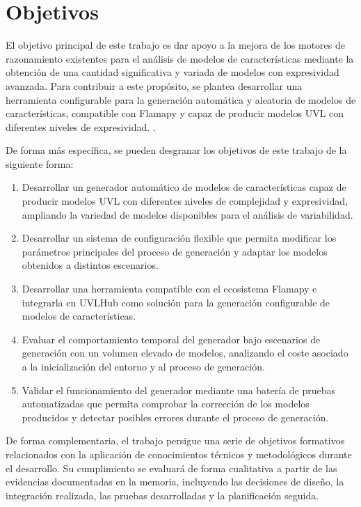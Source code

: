\section{Objetivos}
\label{sec:objetivos}



El objetivo principal de este trabajo es dar apoyo a la mejora de los motores de razonamiento existentes para el análisis de modelos de características mediante la obtención de una cantidad significativa y variada de modelos con expresividad avanzada. Para contribuir a este propósito, se plantea desarrollar una herramienta
configurable para la generación automática y aleatoria de modelos de
características, compatible con Flamapy y capaz de producir modelos UVL con
diferentes niveles de expresividad. \cite{sundermann2024generating}.

De forma más específica, se pueden desgranar los objetivos de este trabajo de la siguiente forma:

\begin{enumerate}[label=\textbf{O\arabic*.}]
      \item Desarrollar un generador automático de modelos de características capaz de producir modelos UVL con diferentes niveles de complejidad y expresividad, ampliando la variedad de modelos disponibles para el análisis de variabilidad.

      \item Desarrollar un sistema de configuración flexible que permita modificar los parámetros principales del proceso de generación y adaptar los modelos obtenidos a distintos escenarios.

      \item Desarrollar una herramienta compatible con el ecosistema Flamapy e integrarla en UVLHub como solución para la generación configurable de modelos de características.

      \item Evaluar el comportamiento temporal del generador bajo escenarios de generación con un volumen elevado de modelos, analizando el coste asociado a la inicialización del entorno y al proceso de generación.

      \item Validar el funcionamiento del generador mediante una batería de pruebas automatizadas que permita comprobar la corrección de los modelos producidos y detectar posibles errores durante el proceso de generación.
\end{enumerate}

De forma complementaria, el trabajo persigue una serie de objetivos formativos
relacionados con la aplicación de conocimientos técnicos y metodológicos durante
el desarrollo. Su cumplimiento se evaluará de forma cualitativa a partir de las
evidencias documentadas en la memoria, incluyendo las decisiones de diseño, la
integración realizada, las pruebas desarrolladas y la planificación seguida.

